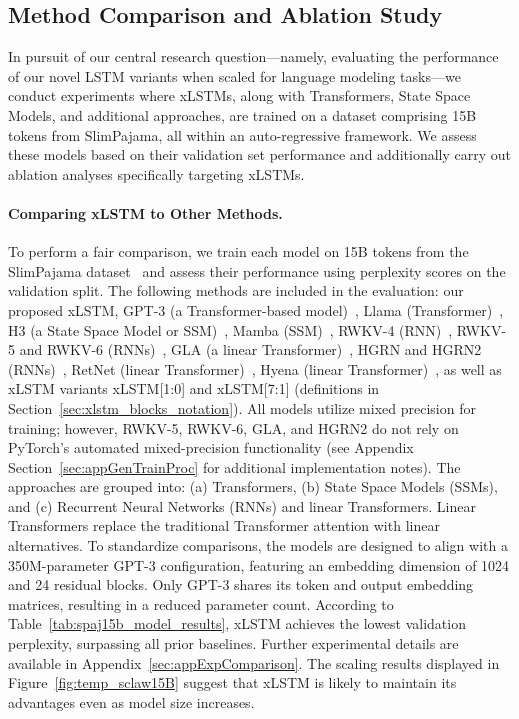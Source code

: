 \subsection{Method Comparison and Ablation Study}
\label{sec:ExpComparison}

In pursuit of our central research question—namely, evaluating the performance of our novel LSTM variants when scaled for language modeling tasks—we conduct experiments where xLSTMs, along with Transformers, State Space Models, and additional approaches, are trained on a dataset comprising 15B tokens from SlimPajama, all within an auto-regressive framework. We assess these models based on their validation set performance and additionally carry out ablation analyses specifically targeting xLSTMs.

\paragraph{Comparing xLSTM to Other Methods.} To perform a fair comparison, we train each model on 15B tokens from the SlimPajama dataset~\citep{Soboleva:23} and assess their performance using perplexity scores on the validation split. The following methods are included in the evaluation: our proposed xLSTM, GPT-3 (a Transformer-based model)~\citep{Brown:20short}, Llama (Transformer)~\citep{Touvron:23arxiv}, H3 (a State Space Model or SSM)~\citep{Fu:23}, Mamba (SSM)~\citep{Gu:24arxiv}, RWKV-4 (RNN)~\citep{Peng:23arxivshort}, RWKV-5 and RWKV-6 (RNNs)~\citep{Peng:24arxivshort}, GLA (a linear Transformer)~\citep{Yang:23arxiv}, HGRN and HGRN2 (RNNs)~\citep{Qin:23,Qin:24arxiv}, RetNet (linear Transformer)~\citep{Sun:23arxiv}, Hyena (linear Transformer)~\citep{Poli:23}, as well as xLSTM variants xLSTM[1:0] and xLSTM[7:1] (definitions in Section~\ref{sec:xlstm_blocks_notation}). 
All models utilize mixed precision for training; however, RWKV-5, RWKV-6, GLA, and HGRN2 do not rely on PyTorch's automated mixed-precision functionality (see Appendix Section~\ref{sec:appGenTrainProc} for additional implementation notes). 
The approaches are grouped into: (a) Transformers, (b) State Space Models (SSMs), and (c) Recurrent Neural Networks (RNNs) and linear Transformers. Linear Transformers replace the traditional Transformer attention with linear alternatives. To standardize comparisons, the models are designed to align with a 350M-parameter GPT-3 configuration, featuring an embedding dimension of 1024 and 24 residual blocks. Only GPT-3 shares its token and output embedding matrices, resulting in a reduced parameter count. According to Table~\ref{tab:spaj15b_model_results}, xLSTM achieves the lowest validation perplexity, surpassing all prior baselines. Further experimental details are available in Appendix~\ref{sec:appExpComparison}. The scaling results displayed in Figure~\ref{fig:temp_sclaw15B} suggest that xLSTM is likely to maintain its advantages even as model size increases.

